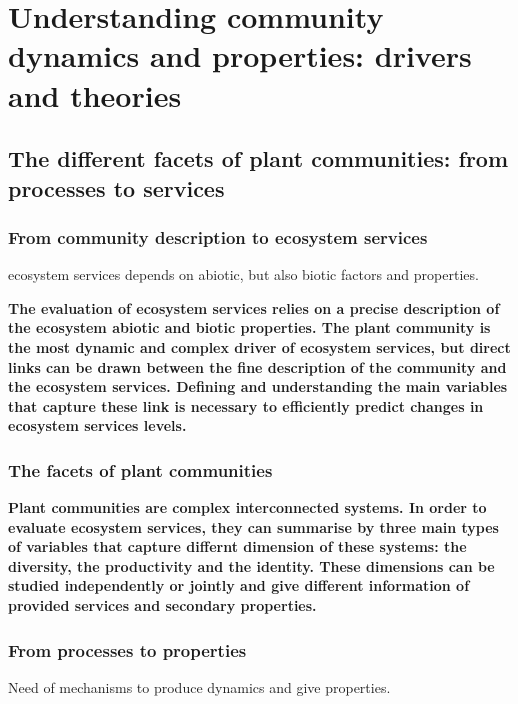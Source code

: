 \chapter{Understanding community dynamics and properties: drivers and theories}

\section{The different facets of plant communities: from processes to services}


\subsection{From community description to ecosystem services}

ecosystem services depends on abiotic, but also biotic factors and properties. 


\textbf{The evaluation of ecosystem services relies on a precise description of the ecosystem abiotic and biotic properties. The plant community is the most dynamic and complex driver of ecosystem services, but direct links can be drawn between the fine description of the community and the ecosystem services. Defining and understanding the main variables that capture these link is necessary to efficiently predict changes in ecosystem services levels.}

\subsection{The facets of plant communities}

\textbf{Plant communities are complex interconnected systems. In order to evaluate ecosystem services, they can summarise by three main types of variables that capture differnt dimension of these systems: the diversity, the productivity and the identity. These dimensions can be studied independently or jointly and give different information of provided services and secondary properties.}

\subsection{From processes to properties}
Need of mechanisms to produce dynamics and give properties.

